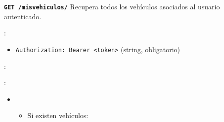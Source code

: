 \documentclass[a4paper,11pt,spanish]{sphinxmanual}
\newcommand{\robotoMonoBold}{\fontseries{b}\selectfont\ttfamily}
\renewcommand{\sphinxcode}[1]{\textcolor{sphinxorangeCode}{{\robotoMonoBold #1}}}
\renewcommand{\sphinxbfcode}[1]{\textbf{\sphinxcode{#1}}}
\renewcommand{\sphinxupquote}[1]{\texttt{#1}}
\begin{document}
\begin{fulllineitems}
\label{\detokenize{endpoints:get--mis-vehiculos-}}
\pysigstartsignatures
\pysigline
{\sphinxbfcode{\sphinxupquote{GET~}}\sphinxbfcode{\sphinxupquote{/mis\sphinxhyphen{}vehiculos/}}}
\pysigstopsignatures
\sphinxAtStartPar
Recupera todos los vehículos asociados al usuario autenticado.

\sphinxAtStartPar
{}:
\begin{itemize}
\item {} 
\sphinxAtStartPar
\sphinxcode{\sphinxupquote{Authorization: Bearer \textless{}token\textgreater{}}} (string, obligatorio)

\end{itemize}

\sphinxAtStartPar
{}:

\begin{sphinxVerbatim}[commandchars=\\\{\}]
  
 
 
\end{sphinxVerbatim}

\sphinxAtStartPar
{}:
\begin{itemize}
\item {} 
\sphinxAtStartPar
{}
\begin{itemize}
\item {} 
\sphinxAtStartPar
Si existen vehículos:


\end{itemize}
\end{itemize}
\end{fulllineitems}
\end{document}
